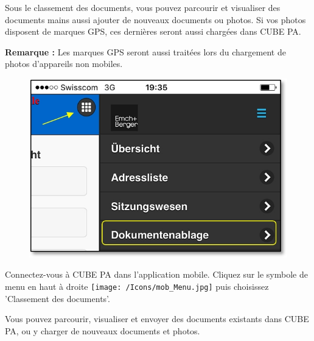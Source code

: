 Sous le classement des documents, vous pouvez parcourir et visualiser des documents mains aussi ajouter de nouveaux documents ou photos. Si vos photos disposent de marques GPS, ces dernières seront aussi chargées dans CUBE PA.

\vspace{\baselineskip}

\textbf{Remarque :} Les marques GPS seront aussi traitées lors du chargement de photos d'appareils non mobiles.

\vspace{\baselineskip}

\begin{figure}   %
  \vspace{-35pt}      %
  \begin{center}
    \includegraphics[width=1\linewidth]{../chapters/11_Dokumentenablage/pictures/11-mob01_Dokumentenablage_oeffnen.jpg}
  \end{center}
  \vspace{-20pt}
  \vspace{-10pt}
\end{figure}

Connectez-vous à CUBE PA dans l'application mobile. Cliquez sur le symbole de menu en haut à droite \texttt{[image: /Icons/mob\_Menu.jpg]} puis choisissez 'Classement des documents'.

\vspace{.5cm}

Vous pouvez parcourir, visualiser et envoyer des documents existants dans CUBE PA, ou y charger de nouveaux documents et photos.

